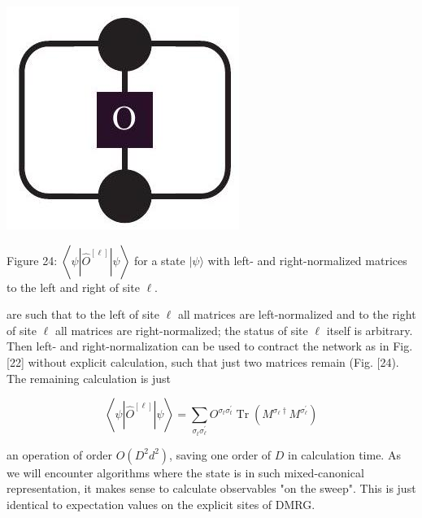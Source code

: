 \documentclass[12pt]{article}
\begin{document}
\begin{center}
\includegraphics[max width=\textwidth]{2024_05_04_afc4ad226da9ccfe0ac8g-037}
\end{center}

Figure 24: $\left\langle\psi\left|\hat{O}^{[\ell]}\right| \psi\right\rangle$ for a state $|\psi\rangle$ with left- and right-normalized matrices to the left and right of site $\ell$.

are such that to the left of site $\ell$ all matrices are left-normalized and to the right of site $\ell$ all matrices are right-normalized; the status of site $\ell$ itself is arbitrary. Then left- and right-normalization can be used to contract the network as in Fig. [22] without explicit calculation, such that just two matrices remain (Fig. [24). The remaining calculation is just


\begin{equation*}
\left\langle\psi\left|\hat{O}^{[\ell]}\right| \psi\right\rangle=\sum_{\sigma_{t} \sigma_{\ell}^{\prime}} O^{\sigma_{t} \sigma_{t}^{\prime}} \operatorname{Tr}\left(M^{\sigma_{\ell} \dagger} M^{\sigma_{\ell}^{\prime}}\right) \tag{97}
\end{equation*}


an operation of order $O\left(D^{2} d^{2}\right)$, saving one order of $D$ in calculation time. As we will encounter algorithms where the state is in such mixed-canonical representation, it makes sense to calculate observables "on the sweep". This is just identical to expectation values on the explicit sites of DMRG.
\end{document}
